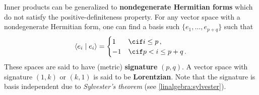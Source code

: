     \begin{remark}\label{linalgebra:NDH_form}
        Inner products can be generalized to \textbf{nondegenerate Hermitian forms} which do not satisfy the positive-definiteness property. For any vector space with a nondegenerate Hermitian form, one can find a basis such $\{e_1,\ldots,e_{p+q}\}$ such that
        \begin{gather}
            \langle e_i\mid e_i \rangle=
            \begin{cases}
                1&\cif i\leq p\,,\\
                -1&\cif p<i\leq p+q\,.
            \end{cases}
        \end{gather}
        These spaces are said to have (metric) \textbf{signature} $(p,q)$. A vector space with signature $(1,k)$ or $(k,1)$ is said to be \textbf{Lorentzian}. Note that the signature is basis independent due to \textit{Sylvester's theorem} (see \cref{linalgebra:sylvester}).
    \end{remark}

